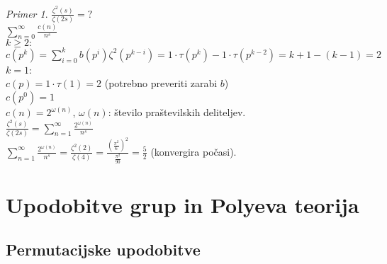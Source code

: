 \documentclass[a4paper, 12pt]{book}
\theoremstyle{definition}
\theoremstyle{remark}
\newtheorem*{ex}{Primer}
\begin{document}
\begin{ex}
  $\frac{\zeta^2(s)}{\zeta(2s)} = ?$ \\
  $\sum_{n=0}^{\infty} \frac{c(n)}{n^s}$ \\
  $k \geq 2:$ \\
  $c(p^k) = \sum_{i=0}^{k} b(p^i) \zeta^2(p^{k-i}) = 1 \cdot \tau(p^k) - 1 \cdot \tau(p^{k-2}) = k+1-(k-1) = 2$ \\
  $k = 1$: \\
  $c(p) = 1 \cdot \tau(1) = 2$ (potrebno preveriti zarabi $b$) \\
  $c(p^0) = 1$ \\
  $c(n) = 2^{\omega(n)}$, $\omega(n)$: število praštevilskih deliteljev. \\
  $\frac{\zeta^2(s)}{\zeta(2s)} = \sum_{n=1}^{\infty} \frac{2^{\omega(n)}}{n^s}$ \\
  $\sum_{n=1}^{\infty} \frac{2^{\omega(n)}}{n^s} = \frac{\zeta^2(2)}{\zeta(4)}
  = \frac{\left(\frac{\pi^2}{6}\right)^2}{\frac{\pi^2}{90}} = \frac{5}{2}$ (konvergira počasi).
\end{ex}



\chapter{Upodobitve grup in Polyeva teorija}


\section{Permutacijske upodobitve}
\end{document}
